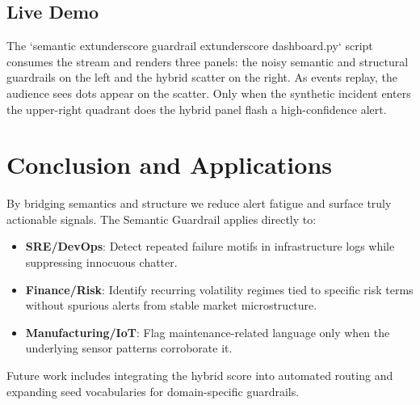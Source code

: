 \documentclass[11pt]{article}
\begin{document}
\subsection{Live Demo}
The `semantic	extunderscore guardrail	extunderscore dashboard.py` script consumes the
stream and renders three panels: the noisy semantic and structural guardrails on
the left and the hybrid scatter on the right. As events replay, the audience sees
dots appear on the scatter. Only when the synthetic incident enters the upper-right
quadrant does the hybrid panel flash a high-confidence alert.

\section{Conclusion and Applications}
By bridging semantics and structure we reduce alert fatigue and surface truly
actionable signals. The Semantic Guardrail applies directly to:
\begin{itemize}
  \item \textbf{SRE/DevOps}: Detect repeated failure motifs in infrastructure logs
        while suppressing innocuous chatter.
  \item \textbf{Finance/Risk}: Identify recurring volatility regimes tied to
        specific risk terms without spurious alerts from stable market microstructure.
  \item \textbf{Manufacturing/IoT}: Flag maintenance-related language only when the
        underlying sensor patterns corroborate it.
\end{itemize}
Future work includes integrating the hybrid score into automated routing and
expanding seed vocabularies for domain-specific guardrails.
\end{document}
